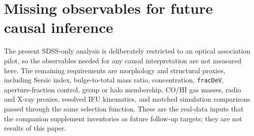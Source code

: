 \documentclass[twocolumn]{aastex631}
\begin{document}
\section{Missing observables for future causal inference}
The present SDSS-only analysis is deliberately restricted to an optical association pilot, so the observables needed for any causal interpretation are not measured here. The remaining requirements are morphology and structural proxies, including Sersic index, bulge-to-total mass ratio, concentration, \texttt{fracDeV}, aperture-fraction control, group or halo membership, CO/HI gas masses, radio and X-ray proxies, resolved IFU kinematics, and matched simulation comparisons passed through the same selection function. These are the real-data inputs that the companion supplement inventories as future follow-up targets; they are not results of this paper.
\end{document}

